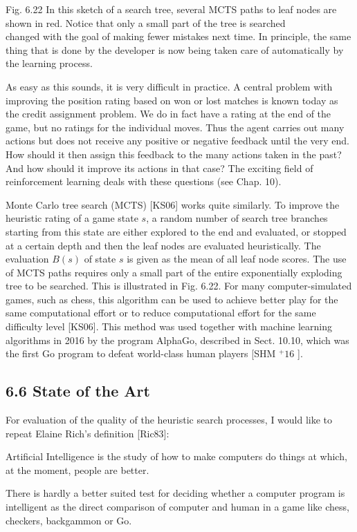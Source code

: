 \documentclass[10pt]{article}
\begin{document}
Fig. 6.22 In this sketch of a search tree, several MCTS paths to leaf nodes are shown in red. Notice that only a small part of the tree is searched\\
changed with the goal of making fewer mistakes next time. In principle, the same thing that is done by the developer is now being taken care of automatically by the learning process.

As easy as this sounds, it is very difficult in practice. A central problem with improving the position rating based on won or lost matches is known today as the credit assignment problem. We do in fact have a rating at the end of the game, but no ratings for the individual moves. Thus the agent carries out many actions but does not receive any positive or negative feedback until the very end. How should it then assign this feedback to the many actions taken in the past? And how should it improve its actions in that case? The exciting field of reinforcement learning deals with these questions (see Chap. 10).

Monte Carlo tree search (MCTS) [KS06] works quite similarly. To improve the heuristic rating of a game state $s$, a random number of search tree branches starting from this state are either explored to the end and evaluated, or stopped at a certain depth and then the leaf nodes are evaluated heuristically. The evaluation $B(s)$ of state $s$ is given as the mean of all leaf node scores. The use of MCTS paths requires only a small part of the entire exponentially exploding tree to be searched. This is illustrated in Fig. 6.22. For many computer-simulated games, such as chess, this algorithm can be used to achieve better play for the same computational effort or to reduce computational effort for the same difficulty level [KS06]. This method was used together with machine learning algorithms in 2016 by the program AlphaGo, described in Sect. 10.10, which was the first Go program to defeat world-class human players [SHM ${ }^{+} 16$ ].

\subsection*{6.6 State of the Art}
For evaluation of the quality of the heuristic search processes, I would like to repeat Elaine Rich's definition [Ric83]:

Artificial Intelligence is the study of how to make computers do things at which, at the moment, people are better.

There is hardly a better suited test for deciding whether a computer program is intelligent as the direct comparison of computer and human in a game like chess, checkers, backgammon or Go.
\end{document}
